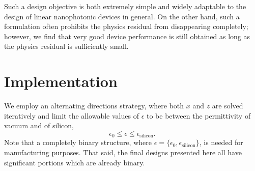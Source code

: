 % 
%     
Such a design objective is both extremely simple and widely adaptable 
    to the design of linear nanophotonic devices in general\cite{Miller12}.
On the other hand, such a formulation often prohibits the physics residual 
    from disappearing completely; 
    however, we find that very good device performance is still obtained
    as long as the physics residual is sufficiently small.

\section{Implementation}
We employ an alternating directions strategy,
    where both $x$ and $z$ are solved iteratively
    and limit the allowable values of $\epsilon$ to be between
    the permittivity of vacuum and of silicon,
    \begin{equation}
    \epsilon_0 \le \epsilon \le \epsilon_\text{silicon}.
    \end{equation}
Note that a completely binary structure,
    where $\epsilon = \{\epsilon_0, \epsilon_\text{silicon}\}$,
    is needed for manufacturing purposes.
That said, the final designs presented here 
    all have significant portions which are already binary.

